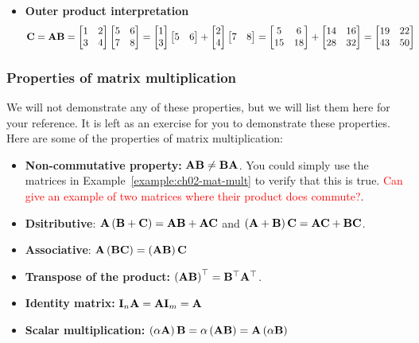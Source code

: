 \begin{boxedstuff}
\begin{example}
\begin{itemize}
            \item \textbf{Outer product interpretation} 
            \[ \begin{split}
                \mf{C} &= \mf{A}\mf{B} = \bmxc 1 & 2 \\ 3 & 4 \emx \bmx 5 & 6 \\ 7 & 8 \emx = \bmx1 \\ 3\emx\bmx 5 & 6\emx + \bmx2 \\ 4\emx\bmx 7 & 8\emx = \bmxc 5 & 6 \\ 15 & 18 \emx + \bmxc 14 & 16 \\ 28 & 32 \emx = \bmxc 19 & 22 \\ 43 & 50 \emx
            \end{split} \]
        \end{itemize}
        \label{example:ch02-mat-mult}
    \end{example}
\end{boxedstuff}

\subsubsection{Properties of matrix multiplication}
We will not demonstrate any of these properties, but we will list them here for your reference. It is left as an exercise for you to demonstrate these properties. Here are some of the properties of matrix multiplication:
\begin{itemize}
    \item \textbf{Non-commutative property:} $\mathbf{A}\mathbf{B} \neq \mathbf{B}\mathbf{A}$. You could simply use the matrices in Example~\ref{example:ch02-mat-mult} to verify that this is true. \textcolor{red}{Can give an example of two matrices where their product does commute?}.
    \item \textbf{Dsitributive}: $\mathbf{A}\left( \mathbf{B} + \mathbf{C}\right) = \mathbf{A}\mathbf{B} + \mathbf{A}\mathbf{C}$ and $\left( \mathbf{A} + \mathbf{B}\right)\mathbf{C} = \mathbf{A}\mathbf{C} + \mathbf{B}\mathbf{C}$.
    \item \textbf{Associative}: $\mathbf{A}\left( \mathbf{B}\mathbf{C}\right) = \left( \mathbf{A}\mathbf{B}\right)\mathbf{C}$
    \item \textbf{Transpose of the product:} $\left( \mathbf{A}\mathbf{B}\right)^\top = \mathbf{B}^\top\mathbf{A}^\top$.
    \item \textbf{Identity matrix:} $\mathbf{I}_n\mathbf{A} = \mathbf{A}\mathbf{I}_m = \mathbf{A}$
    \item \textbf{Scalar multiplication:} $\left( \alpha\mathbf{A}\right)\mathbf{B} = \alpha\left( \mathbf{A}\mathbf{B}\right) = \mathbf{A}\left( \alpha\mathbf{B}\right)$
\end{itemize}

